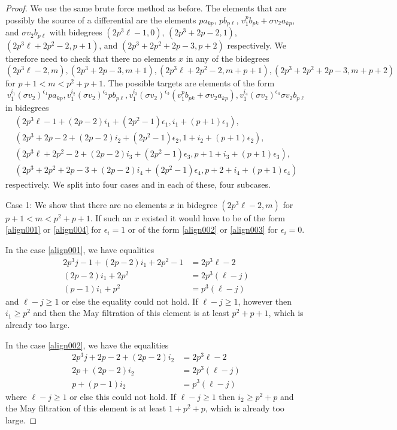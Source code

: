 \begin{proof}
We use the same brute force method as before. The elements that are possibly the source of a differential are the elements $pa_{kp}$, $pb_{p\ell}$, $v_1^pb_{pk}+\sigma v_2 a_{kp}$, and $\sigma v_2 b_{p\ell}$  with bidegrees $(2p^3\ell-1,0)$, $(2p^3+2p-2,1)$,  $(2p^3\ell+2p^2-2,p+1)$, and $(2p^3+2p^2+2p-3,p+2)$ respectively. We therefore need to check that there no elements $x$ in any of the bidegrees
\[ (2p^3\ell-2,m), (2p^3+2p-3,m+1), (2p^3\ell+2p^2-2,m+p+1), (2p^3+2p^2+2p-3,m+p+2) \]
for $p+1<m<p^2+p+1$. The possible targets are elements of the form 
\[v_1^{i_1}(\sigma v_2)^{\epsilon_1}pa_{kp}, v_1^{i_2}(\sigma v_2)^{\epsilon_2}pb_{p\ell},v_1^{i_3}(\sigma v_2)^{\epsilon_3}(v_1^pb_{pk}+\sigma v_2 a_{kp}), v_1^{i_4}(\sigma v_2)^{\epsilon_4}\sigma v_2 b_{p\ell}\]
 in bidegrees 
 \begin{align}
 \label{align001} (2p^3\ell-1+(2p-2)i_1+(2p^2-1)\epsilon_1 , i_1+(p+1)\epsilon_1), \\  
 \label{align002} (2p^3+2p-2+(2p-2)i_2+(2p^2-1)\epsilon_2,1+i_2+(p+1)\epsilon_2), \\
 \label{align003} (2 p^3\ell+2p^2-2 +(2p-2)i_3+(2p^2-1)\epsilon_3,p+1+i_3+(p+1)\epsilon_3),\\ 
 \label{align004} (2p^3+2p^2+2p-3+(2p-2)i_4+(2p^2-1)\epsilon_4,p+2+i_4+(p+1)\epsilon_4)
  \end{align}
 respectively. We split into four cases and in each of these, four subcases. 
 
 Case 1: We show that there are no elements  $x$ in bidegree $(2p^3\ell-2,m)$ for $p+1<m<p^2+p+1$. If such an $x$ existed it would have to be of the form  \eqref{align001} or  \eqref{align004} for $\epsilon_i=1$ or  of the form \eqref{align002} or  \eqref{align003} for $\epsilon_i=0$. 
 
 
In the case \eqref{align001}, we have equalities
\begin{align*}
2p^3j-1+(2p-2)i_1+2p^2-1&=2p^3\ell-2  \\
(2p-2)i_1+2p^2 & = 2p^3(\ell-j) \\
(p-1)i_1+p^2& =p^3(\ell-j) 
\end{align*}
and $\ell-j\ge 1$ or else the equality could not hold. If $\ell-j\ge1$, however then $i_1\ge p^2$ and then the May filtration of this element is at least $p^2+p+1$, which is already too large. 

 In the case \eqref{align002}, we have the equalities
  \begin{align*}
 2p^3j+2p-2+(2p-2)i_2 & = 2p^3\ell-2 \\
 2p+(2p-2)i_2&=2p^3(\ell-j)\\
 p+(p-1)i_2&=p^3(\ell-j)
 \end{align*}
where $\ell-j\ge 1$ or else this could not hold. If $\ell-j\ge 1$ then $i_2\ge p^2+p$ and the May filtration of this element is at least $1+p^2+p$, which is already too large. 


\end{proof}

